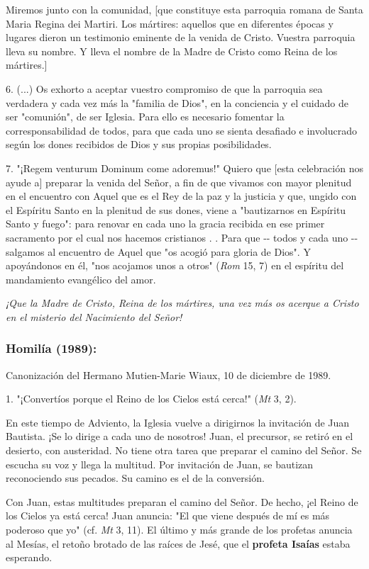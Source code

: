 Miremos junto con la comunidad, {[}que constituye esta parroquia romana
de Santa Maria Regina dei Martiri. Los mártires: aquellos que en
diferentes épocas y lugares dieron un testimonio eminente de la venida
de Cristo. Vuestra parroquia lleva su nombre. Y lleva el nombre de la
Madre de Cristo como Reina de los mártires.{]}

6. (...) Os exhorto a aceptar vuestro compromiso de que la parroquia sea
verdadera y cada vez más la "familia de Dios", en la conciencia y el
cuidado de ser "comunión", de ser Iglesia. Para ello es necesario
fomentar la corresponsabilidad de todos, para que cada uno se sienta
desafiado e involucrado según los dones recibidos de Dios y sus propias
posibilidades.

7. "¡Regem venturum Dominum come adoremus!" Quiero que {[}esta
celebración nos ayude a{]} preparar la venida del Señor, a fin de que
vivamos con mayor plenitud en el encuentro con Aquel que es el Rey de la
paz y la justicia y que, ungido con el Espíritu Santo en la plenitud de
sus dones, viene a "bautizarnos en Espíritu Santo y fuego": para renovar
en cada uno la gracia recibida en ese primer sacramento por el cual nos
hacemos cristianos . . Para que -\/- todos y cada uno -\/- salgamos al
encuentro de Aquel que "os acogió para gloria de Dios". Y apoyándonos en
él, "nos acojamos unos a otros" (\emph{Rom} 15, 7) en el espíritu del
mandamiento evangélico del amor.

\emph{¡Que la Madre de Cristo, Reina de los mártires, una vez más os
	acerque a Cristo en el misterio del Nacimiento del Señor!}

\subsubsection{Homilía (1989): }

Canonización del Hermano Mutien-Marie Wiaux, 10 de diciembre de 1989.

1. "¡Convertíos porque el Reino de los Cielos está cerca!" (\emph{Mt} 3,
2).

En este tiempo de Adviento, la Iglesia vuelve a dirigirnos la invitación
de Juan Bautista. ¡Se lo dirige a cada uno de nosotros! Juan, el
precursor, se retiró en el desierto, con austeridad. No tiene otra tarea
que preparar el camino del Señor. Se escucha su voz y llega la multitud.
Por invitación de Juan, se bautizan reconociendo sus pecados. Su camino
es el de la conversión.

Con Juan, estas multitudes preparan el camino del Señor. De hecho, ¡el
Reino de los Cielos ya está cerca! Juan anuncia: "El que viene después
de mí es más poderoso que yo" (cf. \emph{Mt} 3, 11). El último y más
grande de los profetas anuncia al Mesías, el retoño brotado de las
raíces de Jesé, que el \textbf{profeta Isaías} estaba esperando.

